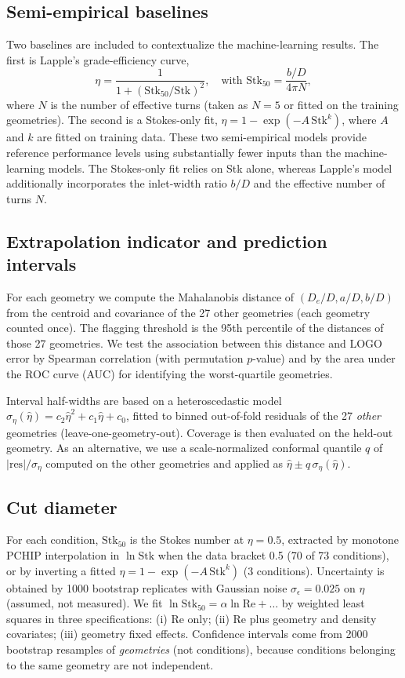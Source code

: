 \documentclass[12pt]{article}
\newcommand{\Stk}{\mathrm{Stk}}
\newcommand{\Rey}{\mathrm{Re}}
\begin{document}
\subsection{Semi-empirical baselines}
Two baselines are included to contextualize the machine-learning results. The first is Lapple's grade-efficiency curve,
\begin{equation}
\eta = \frac{1}{1 + (\Stk_{50}/\Stk)^2}, \quad \text{with } \Stk_{50} = \frac{b/D}{4\pi N},
\end{equation}
where $N$ is the number of effective turns (taken as $N=5$ or fitted on the training geometries). The second is a Stokes-only fit, $\eta = 1 - \exp(-A\,\Stk^{k})$, where $A$ and $k$ are fitted on training data. These two semi-empirical models provide reference performance levels using substantially fewer inputs than the machine-learning models. The Stokes-only fit relies on Stk alone, whereas Lapple's model additionally incorporates the inlet-width ratio $b/D$ and the effective number of turns $N$.

\subsection{Extrapolation indicator and prediction intervals}
For each geometry we compute the Mahalanobis distance of $(D_e/D, a/D, b/D)$ from the centroid and covariance of the 27 other geometries (each geometry counted once). The flagging threshold is the 95th percentile of the distances of those 27 geometries. We test the association between this distance and LOGO error by Spearman correlation (with permutation $p$-value) and by the area under the ROC curve (AUC) for identifying the worst-quartile geometries.

Interval half-widths are based on a heteroscedastic model $\sigma_\eta(\hat\eta) = c_2\hat\eta^2 + c_1\hat\eta + c_0$, fitted to binned out-of-fold residuals of the 27 \emph{other} geometries (leave-one-geometry-out). Coverage is then evaluated on the held-out geometry. As an alternative, we use a scale-normalized conformal quantile $q$ of $|\text{res}|/\sigma_\eta$ computed on the other geometries and applied as $\hat\eta \pm q\,\sigma_\eta(\hat\eta)$.

\subsection{Cut diameter}
For each condition, $\Stk_{50}$ is the Stokes number at $\eta = 0.5$, extracted by monotone PCHIP interpolation in $\ln\Stk$ when the data bracket 0.5 (70 of 73 conditions), or by inverting a fitted $\eta = 1 - \exp(-A\,\Stk^{k})$ (3 conditions). Uncertainty is obtained by 1000 bootstrap replicates with Gaussian noise $\sigma_\epsilon = 0.025$ on $\eta$ (assumed, not measured). We fit $\ln\Stk_{50} = \alpha\ln\Rey + \dots$ by weighted least squares in three specifications: (i) Re only; (ii) Re plus geometry and density covariates; (iii) geometry fixed effects. Confidence intervals come from 2000 bootstrap resamples of \emph{geometries} (not conditions), because conditions belonging to the same geometry are not independent.
\end{document}
